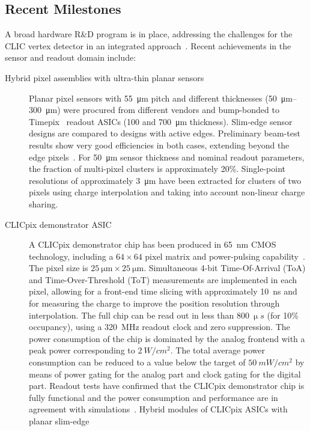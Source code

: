 \subsection{Recent Milestones}
A broad hardware R\&D program is in place, addressing the challenges for the CLIC
vertex detector in an integrated approach~\cite{1748-0221-10-03-C03025}. Recent achievements
in the sensor and readout domain include:
\begin{description}
\item[Hybrid pixel assemblies with ultra-thin planar sensors]
Planar pixel sensors with \SI{55}{\micro\meter} pitch and different thicknesses (\SIrange{50}{300}{\micro\meter})
were procured from different vendors and bump-bonded to Timepix~\cite{Llopart2007485} readout
ASICs (100 and \SI{700}{\micro\meter} thickness).
Slim-edge sensor designs are compared to designs
with active edges.
Preliminary beam-test results show very good efficiencies in both cases, extending beyond the
edge pixels~\cite{Redford:1966932}.
For \SI{50}{\micro\meter} sensor thickness and nominal readout parameters, the fraction of multi-pixel clusters
is approximately 20\%.
Single-point resolutions of approximately \SI{3}{\micro\meter} have been extracted
for clusters of two pixels using charge interpolation and taking into account
non-linear charge sharing.
\item[CLICpix demonstrator ASIC]
A CLICpix demonstrator chip has been produced in \SI{65}{nm} CMOS technology,
including a $64 \times 64$ pixel matrix and power-pulsing capability~\cite{Valerio:1507691}.
The pixel size is $\SI{25}{\micro\meter}\times\SI{25}{\micro\meter}$. Simultaneous
4-bit Time-Of-Arrival (ToA) and Time-Over-Threshold (ToT) measurements
are implemented in each pixel, allowing for a front-end time slicing
with approximately \SI{10}{ns} and for measuring the charge
to improve the position resolution through interpolation.
The full chip can be read out in less than
$\SI{800}{\upmu s}$ (for 10\% occupancy), using a \SI{320}{MHz} readout clock and zero suppression.
The
power consumption of the chip is dominated by the analog frontend
with a peak power corresponding to $\SI{2}{W/cm^2}$. The total average power
consumption can be reduced to a value below the target of $\SI{50}{mW/cm^2}$
by means of power gating for the analog part and clock gating for the digital part.
Readout tests have confirmed that the CLICpix demonstrator chip
is fully functional and the power consumption and performance are in agreement with
simulations~\cite{Valerio:1635171}.
Hybrid modules of CLICpix ASICs with planar slim-edge

\end{description}
